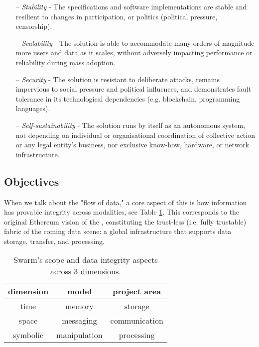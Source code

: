 \begin{itemize}[noitemsep]
\item[--] \emph{Stability} - The specifications and software implementations are stable and resilient to changes in participation, or politics (political pressure, censorship).
\item[--] \emph{Scalability} - The solution is able to accommodate many orders of magnitude more users and data as it scales, without adversely impacting performance or reliability during mass adoption.  
\item[--] \emph{Security} - The solution is resistant to deliberate attacks, remains impervious to social pressure and political influences, and demonstrates fault tolerance in its technological dependencies (e.g. blockchain, programming languages). 
\item[--] \emph{Self-sustainability} - The solution runs by itself as an autonomous system, not depending on individual or organisational coordination of collective action or any legal entity's business, nor exclusive know-how, hardware, or network infrastructure. 
\end{itemize}




\subsection{Objectives \statusyellow}\label{sec:objectives}


When we talk about the "flow of data," a core aspect of this is how information has provable integrity across modalities, see Table \ref{tab:scope}. This corresponds to the original Ethereum vision of the ,  constituting the trust-less (i.e. fully trustable) fabric of the coming data scene: a global infrastructure that supports data storage, transfer, and processing.

\begin{table}[!htb]
\centering
\begin{tabular}{c|c|c}
dimension & model & project area\\\hline
%
time & memory & storage \\
space & messaging & communication \\
symbolic & manipulation & processing \\
\end{tabular}
\caption{Swarm's scope and data integrity aspects across 3 dimensions.}
\label{tab:scope}
\end{table}

